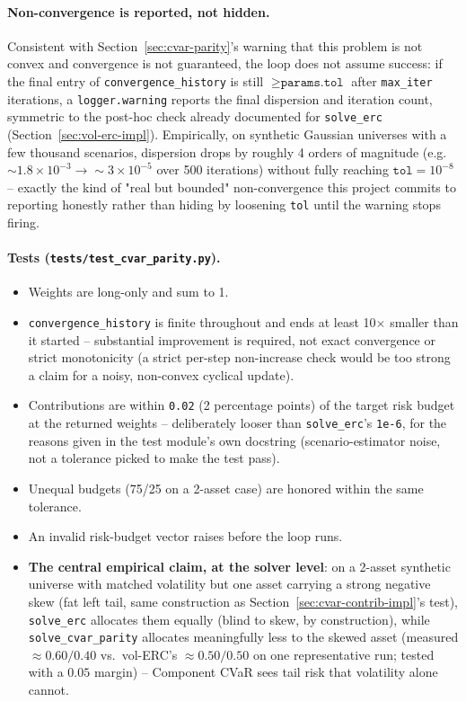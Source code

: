 \documentclass[11pt]{article}
\begin{document}
\paragraph{Non-convergence is reported, not hidden.} Consistent with
Section~\ref{sec:cvar-parity}'s warning that this problem is not
convex and convergence is not guaranteed, the loop does not assume
success: if the final entry of \texttt{convergence\_history} is still
$\geq \texttt{params.tol}$ after \texttt{max\_iter} iterations, a
\texttt{logger.warning} reports the final dispersion and iteration
count, symmetric to the post-hoc check already documented for
\texttt{solve\_erc} (Section~\ref{sec:vol-erc-impl}). Empirically, on
synthetic Gaussian universes with a few thousand scenarios, dispersion
drops by roughly 4 orders of magnitude (e.g.\ $\sim 1.8\times 10^{-3}
\to \sim 3\times 10^{-5}$ over 500 iterations) without fully reaching
$\texttt{tol} = 10^{-8}$ -- exactly the kind of "real but bounded"
non-convergence this project commits to reporting honestly rather than
hiding by loosening \texttt{tol} until the warning stops firing.

\paragraph{Tests (\texttt{tests/test\_cvar\_parity.py}).}
\begin{itemize}
    \item Weights are long-only and sum to 1.
    \item \texttt{convergence\_history} is finite throughout and ends
    at least 10$\times$ smaller than it started -- substantial
    improvement is required, not exact convergence or strict
    monotonicity (a strict per-step non-increase check would be too
    strong a claim for a noisy, non-convex cyclical update).
    \item Contributions are within \texttt{0.02} (2 percentage points)
    of the target risk budget at the returned weights -- deliberately
    looser than \texttt{solve\_erc}'s \texttt{1e-6}, for the reasons
    given in the test module's own docstring (scenario-estimator noise,
    not a tolerance picked to make the test pass).
    \item Unequal budgets (75/25 on a 2-asset case) are honored within
    the same tolerance.
    \item An invalid risk-budget vector raises before the loop runs.
    \item \textbf{The central empirical claim, at the solver level}:
    on a 2-asset synthetic universe with matched volatility but one
    asset carrying a strong negative skew (fat left tail, same
    construction as Section~\ref{sec:cvar-contrib-impl}'s test),
    \texttt{solve\_erc} allocates them equally (blind to skew, by
    construction), while \texttt{solve\_cvar\_parity} allocates
    meaningfully less to the skewed asset (measured $\approx 0.60/0.40$
    vs.\ vol-ERC's $\approx 0.50/0.50$ on one representative run;
    tested with a $0.05$ margin) -- Component CVaR sees tail risk that
    volatility alone cannot.
\end{itemize}
\end{document}
